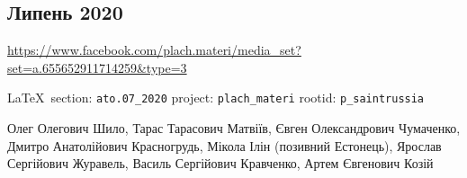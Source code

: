  
 
\subsection{Липень 2020}
\url{https://www.facebook.com/plach.materi/media_set?set=a.655652911714259&type=3}
  
\vspace{0.5cm}
{\small\LaTeX~section: \verb|ato.07_2020| project: \verb|plach_materi| rootid: \verb|p_saintrussia|}
\vspace{0.5cm}

Олег Олегович Шило, Тарас Тарасович Матвіїв, Євген Олександрович Чумаченко,
Дмитро Анатолійович Красногрудь, Мікола Ілін (позивний Естонець), Ярослав
Сергійович Журавель, Василь Сергійович Кравченко, Артем Євгенович Козій
  
